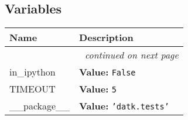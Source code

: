 
  \subsection{Variables}

    \vspace{-1cm}
\hspace{\varindent}\begin{longtable}{|p{\varnamewidth}|p{\vardescrwidth}|l}
\cline{1-2}
\cline{1-2} \centering \textbf{Name} & \centering \textbf{Description}& \\
\cline{1-2}
\endhead\cline{1-2}\multicolumn{3}{r}{\small\textit{continued on next page}}\\\endfoot\cline{1-2}
\endlastfoot\raggedright i\-n\-\_\-i\-p\-y\-t\-h\-o\-n\- & \raggedright \textbf{Value:} 
{\tt False}&\\
\cline{1-2}
\raggedright T\-I\-M\-E\-O\-U\-T\- & \raggedright \textbf{Value:} 
{\tt 5}&\\
\cline{1-2}
\raggedright \_\-\_\-p\-a\-c\-k\-a\-g\-e\-\_\-\_\- & \raggedright \textbf{Value:} 
{\tt \texttt{'}\texttt{datk.tests}\texttt{'}}&\\
\cline{1-2}
\end{longtable}


